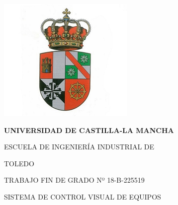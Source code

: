 

\pagestyle{empty}       %

\begin{center}
    \includegraphics[scale=0.85]{portada/uclm_to.jpg}     %
\end{center}

\begin{center}
 \LARGE{\bf{UNIVERSIDAD DE CASTILLA-LA MANCHA}}
\end{center}

\begin{center}
 \LARGE{ESCUELA DE INGENIERÍA INDUSTRIAL DE}
\end{center}

\begin{center}
 \LARGE{TOLEDO}
\end{center}

\vspace{4mm}

\begin{center}
 \LARGE{TRABAJO FIN DE GRADO Nº 18-B-225519}
\end{center}

\vspace{4mm}

\begin{center}
 \LARGE{SISTEMA DE CONTROL VISUAL DE EQUIPOS}
\end{center}

\vspace{10mm}

